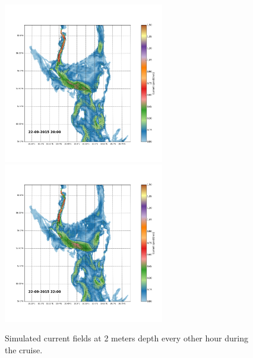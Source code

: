 \documentclass[12pt,a4paper,english]{article}
\begin{document}
\begin{figure}[h]
{}
\centerline{
\includegraphics*[trim=2.0cm 3cm 6.0cm 3.5cm,clip=true,height=7cm]{Python/stromfelt_102}
\includegraphics*[trim=3.7cm 3cm 1.3cm 3.5cm,clip=true,height=7cm]{Python/stromfelt_104}
}
\caption{\small
Simulated current fields at 2 meters depth every other hour during the cruise.}
\label{fig:Current3}
\end{figure}
\end{document}
